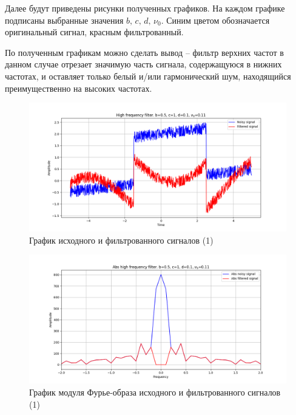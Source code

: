 \documentclass[a4paper, 12pt]{article}
\begin{document}
    Далее будут приведены рисунки полученных графиков. На каждом графике подписаны выбранные значения $b,\,c,\,d,\,\nu_0$. 
    Синим цветом обозначается оригинальный сигнал, красным фильтрованный.


    По полученным графикам можно сделать вывод -- фильтр верхних частот в данном случае отрезает значимую часть сигнала,
    содержащуюся в нижних частотах, и оставляет только белый и/или гармонический шум, находящийся преимущественно на высоких частотах.


    \begin{figure}[!htb]
        \centering
        \includegraphics[scale=0.48]{1_u_flt_u_nolow.png}
        \captionsetup{skip=0pt}
        \caption{График исходного и фильтрованного сигналов (1)}
        \label{fig:fig27}
    \end{figure}
    \begin{figure}[!htb]
        \centering
        \includegraphics[scale=0.48]{1_abs_u_U_nolow.png}
        \captionsetup{skip=0pt}
        \caption{График модуля Фурье-образа исходного и фильтрованного сигналов (1)}
        \label{fig:fig28}
    \end{figure}
\end{document}
